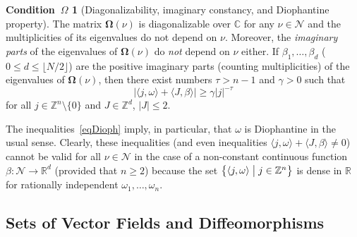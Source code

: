 \documentclass[12pt,reqno]{amsart}
\theoremstyle{definition}
\newtheorem*{cond}{Condition~$\Omega$} \newtheorem*{nott}{Notation~${\mathfrak T}$}
\begin{document}
\begin{cond}[Diagonalizability, imaginary constancy, and Diophantine property]
The matrix ${\mathbf{\Omega}}(\nu)$ is diagonalizable over ${\mathbb C}$ for any $\nu\in{\mathcal N}$ and
the multiplicities of its eigenvalues do not depend on $\nu$. Moreover, the
\emph{imaginary parts} of the eigenvalues of ${\mathbf{\Omega}}(\nu)$ do \emph{not}
depend on $\nu$ either. If $\beta_1,\ldots,\beta_d$
($0{\leqslant} d{\leqslant}\lfloor N/2\rfloor$) are the positive imaginary parts (counting
multiplicities) of the eigenvalues of ${\mathbf{\Omega}}(\nu)$, then there exist numbers
$\tau>n-1$ and $\gamma>0$ such that
\begin{equation}
\bigl| \langle j,\omega\rangle+\langle J,\beta\rangle \bigr| {\geqslant}
\gamma|j|^{-\tau}
\label{eqDioph}
\end{equation}
for all $j\in{\mathbb Z}^n\setminus\{0\}$ and $J\in{\mathbb Z}^d$, $|J|{\leqslant} 2$.
\end{cond}

The inequalities~\eqref{eqDioph} imply, in particular, that $\omega$ is
Diophantine in the usual sense. Clearly, these inequalities (and even
inequalities $\langle j,\omega\rangle+\langle J,\beta\rangle\neq 0$) cannot be
valid for all $\nu\in{\mathcal N}$ in the case of a non-constant continuous function
$\beta:{\mathcal N}\to{\mathbb R}^d$ (provided that $n{\geqslant} 2$) because the set
$\bigl\{ \langle j,\omega\rangle \bigm| j\in{\mathbb Z}^n \bigr\}$ is dense in ${\mathbb R}$
for rationally independent $\omega_1,\ldots,\omega_n$.

\subsection{Sets of Vector Fields and Diffeomorphisms}\label{LG}
\end{document}
